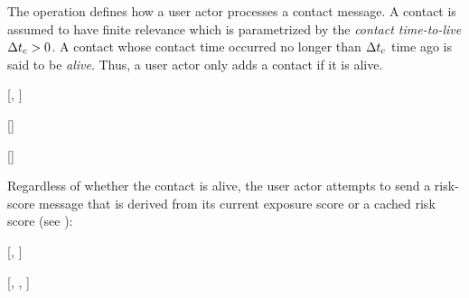 The \cHandleContactMessage operation defines how a user actor processes a
contact message. A contact is assumed to have finite relevance which is
parametrized by the \emph{contact time-to-live} ${\Delta}t_c > 0$. A
contact whose contact time occurred no longer than ${\Delta}t_c$ time ago is
said to be \emph{alive}. Thus, a user actor only adds a contact if it is
alive.
%
\begin{function}{\nHandleContactMessage}[\vActor, \vContact]
	\mState{\aContactKey \assign \aContactName}
	\mState{\cInsert[\aActorContacts, \vContact]}
	\mState{\cStartContactsRefreshTimer[\vActor]}
	\mState{\cSendCurrentOrCached[\vActor, \vContact]}
\EndIf
\end{function}
%
\begin{function}{\nStartContactsRefreshTimer}[\vActor]
\mState{\vOldest \assign \cMinimum[\aActorContacts]}
\mIf{\vOldest \notEquals \nil}
	\mState{\cStartTimer[\vTimer, \cContactTtl[\vOldest]]}
\EndIf
\end{function}
%
\begin{function}{\nHandleContactsRefreshTimer}[\vTimer]
\mForEach{\vContact \in \aActorContacts}
		\mState{\cDelete[\aActorContacts, \vContact]}
	\EndIf
\EndFor
\mState{\cStartContactsRefreshTimer[\vActor]}
\end{function}
%
Regardless of whether the contact is alive, the user actor attempts to send a
risk-score message that is derived from its current exposure score or a
cached risk score (see ):
%
\begin{function}{\nSendCurrentOrCached}[\vActor, \vContact]
\mIf{\cShouldReceive[\vContact, \aActorScore]} \label{step:send-current}
	\mState{\cSend[\vActor, \vContact, \aActorScore]}
\Else
	\mState{\vScore \assign \cCacheMax[\aActorCache, \aContactTime +
\pTimeBuffer]} \label{step:cache-max}
		\mState{\cSend[\vActor, \vContact, \vScore]}
	\EndIf
\EndIf
\end{function}
%
\begin{function}{\nSend}[\vActor, \vContact, \vScore]
\mState{\aSentScoreValue \assign \pTransRate \cdot \aScoreValue}
\mState{\aSentScoreTime \assign \aScoreTime}
\mState{\aSentScoreSender \assign \aActorName}
\mState{\cSend[\vContact, \vSentScore]}
\mState{\cUpdateThreshold[\vContact, \vSentScore]}
\end{function}
